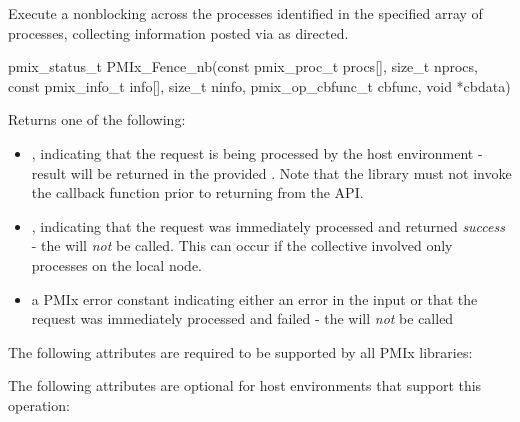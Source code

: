 \summary

Execute a nonblocking  across the processes identified in the specified array of processes, collecting information posted via  as directed.

\format

\cspecificstart
\begin{codepar}
pmix_status_t
PMIx_Fence_nb(const pmix_proc_t procs[], size_t nprocs,
              const pmix_info_t info[], size_t ninfo,
              pmix_op_cbfunc_t cbfunc, void *cbdata)
\end{codepar}
\cspecificend

\begin{arglist}
\end{arglist}

Returns one of the following:

\begin{itemize}
    \item {}, indicating that the request is being processed by the host environment - result will be returned in the provided . Note that the library must not invoke the callback function prior to returning from the \ac{API}.
    \item {}, indicating that the request was immediately processed and returned \textit{success} - the  will \textit{not} be called. This can occur if the collective involved only processes on the local node.
    \item a PMIx error constant indicating either an error in the input or that the request was immediately processed and failed - the  will \textit{not} be called
\end{itemize}


\reqattrstart
The following attributes are required to be supported by all \ac{PMIx} libraries:


\reqattrend

\optattrstart
The following attributes are optional for host environments that support this operation:

